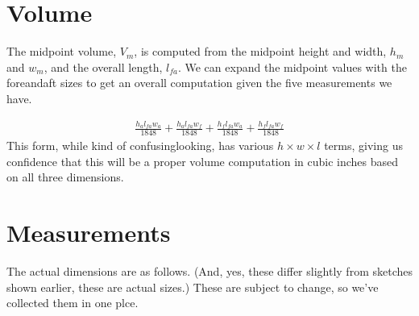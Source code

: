 \documentclass[letterpaper,10pt,english]{sphinxmanual}
\begin{document}
\section{Volume}
\label{\detokenize{prism:volume}}
\sphinxAtStartPar
The mid\sphinxhyphen{}point volume, \(V_m\), is computed from the midpoint height and width, \(h_m\) and \(w_m\), and the overall length, \(l_{fa}\). We can expand the midpoint values with the fore\sphinxhyphen{}and\sphinxhyphen{}aft sizes
to get an overall computation given the five measurements we have.

\begin{sphinxVerbatim}[commandchars=\\\{\}]
        
\end{sphinxVerbatim}
\begin{equation*}
\begin{split}\displaystyle \frac{h_{a} l_{fa} w_{a}}{1848} + \frac{h_{a} l_{fa} w_{f}}{1848} + \frac{h_{f} l_{fa} w_{a}}{1848} + \frac{h_{f} l_{fa} w_{f}}{1848}\end{split}
\end{equation*}
\sphinxAtStartPar
This form, while kind of confusing\sphinxhyphen{}looking, has various \(h \times w \times l\) terms, giving us confidence that this will be a proper volume computation in cubic inches based on all three dimensions.


\section{Measurements}
\label{\detokenize{prism:measurements}}
\sphinxAtStartPar
The actual dimensions are as follows.
(And, yes, these differ slightly from sketches shown earlier, these are actual sizes.) These are subject to change, so we’ve collected them in one plce.

\begin{sphinxVerbatim}[commandchars=\\\{\}]
  
     
        

     
     

     
\end{sphinxVerbatim}
\end{document}
